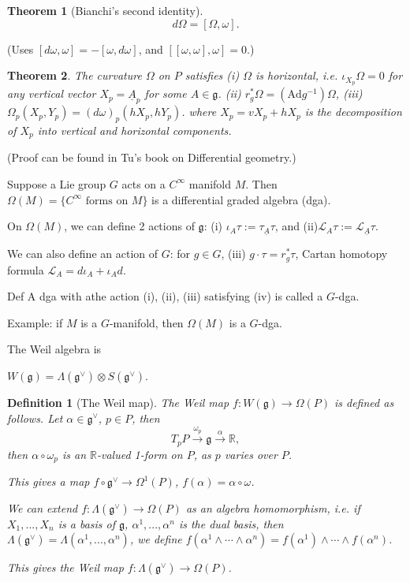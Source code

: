 \documentclass{article}
\theoremstyle{mystyle}
\newtheorem*{definition}{Definition}%
\newtheorem*{theorem*}{Theorem}
\theoremstyle{remark}
\numberwithin{equation}{section}
\begin{document}
\begin{theorem*}[Bianchi's second identity]
$$d\Omega = [\Omega,\omega].$$
\end{theorem*}
(Uses $[d\omega,\omega] = -[\omega,d\omega]$, and $[[\omega,\omega],\omega]=0$.)

\begin{theorem*} The curvature $\Omega$ on $P$ satisfies (i) $\Omega$ is horizontal, i.e. $\iota_{X_p}\Omega=0$ for any vertical vector $X_p = \underline{A}_p$ for some $A\in \mathfrak{g}$. (ii) $r_g^*\Omega = (\mathrm{Ad}g^{-1}) \Omega$, (iii) $\Omega_p(X_p,Y_p) = (d\omega)_p(hX_p,hY_p)$. where $X_p = vX_p + hX_p$ is the decomposition of $X_p$ into vertical and horizontal components.
\end{theorem*}
(Proof can be found in Tu's book on Differential geometry.)

Suppose a Lie group $G$ acts on a $C^\infty$ manifold $M$. Then $\Omega(M) = \{C^\infty\text{ forms on }M\}$ is a differential graded algebra (\textsf{dga}).

On $\Omega(M)$, we can define 2 actions of $\mathfrak{g}$: (i) $\iota_A\tau := \tau_{\underline{A}}\tau$, and (ii)$\mathcal{L}_A\tau :=  \mathcal{L}_{\underline{A}}\tau$.

We can also define an action of $G$: for $g\in G$, (iii) $g\cdot \tau = r^*_g\tau$, Cartan homotopy formula $\mathcal{L}_A = d\iota_A + \iota_A d$.

Def A \textsf{dga} with athe action (i), (ii), (iii) satisfying (iv) is called a $G$-\textsf{dga}.

Example: if $M$ is a $G$-manifold, then $\Omega(M)$ is a $G$-\textsf{dga}.

The Weil algebra is

$W(\mathfrak{g}) = \Lambda(\mathfrak{g}^\vee)\otimes S(\mathfrak{g}^\vee)$. 

\begin{definition}[The Weil map] The \emph{Weil map} $f\colon W(\mathfrak{g}) \rightarrow \Omega(P)$ is defined as follows. Let $\alpha \in \mathfrak{g}^\vee$, $p\in P$, then
$$T_pP\xrightarrow{\omega_p}\mathfrak{g}\xrightarrow{\alpha} \mathbb{R},$$
then $\alpha\circ \omega_p$ is an $\mathbb{R}$-valued 1-form on $P$, as $p$ varies over $P$.

This gives a map $f\circ \mathfrak{g}^\vee \rightarrow \Omega^1(P)$, $f(\alpha) = \alpha\circ \omega$. 

We can extend $f\colon \Lambda(\mathfrak{g}^\vee)\rightarrow \Omega(P)$ as an algebra homomorphism, i.e. if $X_1,...,X_n$ is a basis of $\mathfrak{g}$, $\alpha^1,...,\alpha^n$ is the dual basis, then
$\Lambda(\mathfrak{g}^\vee) = \Lambda(\alpha^1,...,\alpha^n)$, we define
$f(\alpha^1\wedge \cdots \wedge\alpha^n)
 = f(\alpha^1)\wedge \cdots \wedge f(\alpha^n)$. 

This gives the Weil map $f\colon \Lambda(\mathfrak{g}^\vee)\rightarrow \Omega(P)$.
\end{definition}
\end{document}
